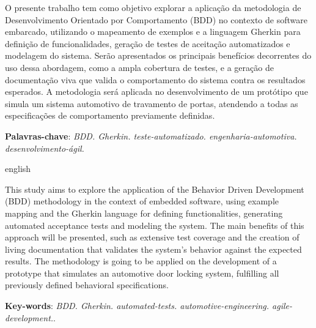 \setlength{\absparsep}{18pt} %
\begin{resumo}

	O presente trabalho tem como objetivo explorar a aplicação da metodologia de Desenvolvimento Orientado por Comportamento (BDD) no contexto de software embarcado, utilizando o mapeamento de exemplos e a linguagem Gherkin para definição de funcionalidades, geração de testes de aceitação automatizados e modelagem do sistema. Serão apresentados os principais benefícios decorrentes do uso dessa abordagem, como a ampla cobertura de testes, e a geração de documentação viva que valida o comportamento do sistema contra os resultados esperados. A metodologia será aplicada no desenvolvimento de um protótipo que simula um sistema automotivo de travamento de portas, atendendo a todas as especificações de comportamento previamente definidas.
	
	\vspace{\onelineskip}
    \noindent
	\textbf{Palavras-chave}: \textit{BDD. Gherkin. teste-automatizado. engenharia-automotiva. desenvolvimento-ágil.}

\end{resumo}

\begin{resumo}[Abstract]
\begin{otherlanguage*}{english}

	This study aims to explore the application of the Behavior Driven Development (BDD) methodology in the context of embedded software, using example mapping and the Gherkin language for defining functionalities, generating automated acceptance tests and modeling the system. The main benefits of this approach will be presented, such as extensive test coverage and the creation of  living documentation that validates the system’s behavior against the expected results. The methodology is going to be applied on the development of a prototype that simulates an automotive door locking system, fulfilling all previously defined behavioral specifications.
	
	\vspace{\onelineskip}
	\noindent
	\textbf{Key-words}: \textit{BDD. Gherkin. automated-tests. automotive-engineering. agile-development.}.

\end{otherlanguage*}
\end{resumo}



